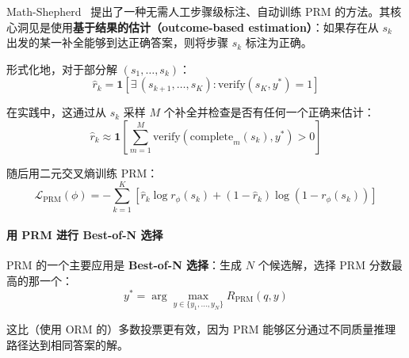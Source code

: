 Math-Shepherd~\cite{wang2024mathshepherd} 提出了一种无需人工步骤级标注、自动训练 PRM 的方法。其核心洞见是使用\textbf{基于结果的估计（outcome-based estimation）}：如果存在从 $s_k$ 出发的某一补全能够到达正确答案，则将步骤 $s_k$ 标注为正确。

形式化地，对于部分解 $(s_1, \ldots, s_k)$：
\begin{equation}
    \hat{r}_k = \mathbf{1}\!\left[\exists\, (s_{k+1}, \ldots, s_K) : \text{verify}(s_K, y^*) = 1\right]
\end{equation}

在实践中，这通过从 $s_k$ 采样 $M$ 个补全并检查是否有任何一个正确来估计：
\begin{equation}
    \hat{r}_k \approx \mathbf{1}\!\left[\sum_{m=1}^{M} \text{verify}(\text{complete}_m(s_k), y^*) > 0\right]
\end{equation}

随后用二元交叉熵训练 PRM：
\begin{equation}
    \mathcal{L}_{\text{PRM}}(\phi) = -\sum_{k=1}^{K} \left[ \hat{r}_k \log r_\phi(s_k) + (1-\hat{r}_k) \log(1 - r_\phi(s_k)) \right]
\end{equation}

\paragraph{用 PRM 进行 Best-of-N 选择}
\label{prm-for-best-of-n-selection}

PRM 的一个主要应用是 \textbf{Best-of-N 选择}：生成 $N$ 个候选解，选择 PRM 分数最高的那一个：
\begin{equation}
    y^* = \arg\max_{y \in \{y_1, \ldots, y_N\}} R_{\text{PRM}}(q, y)
\end{equation}

这比（使用 ORM 的）多数投票更有效，因为 PRM 能够区分通过不同质量推理路径达到相同答案的解。

